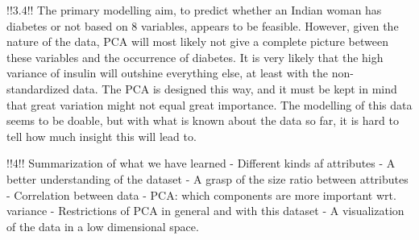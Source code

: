 !!3.4!!
The primary modelling aim, to predict whether an Indian woman has diabetes or not
based on 8 variables, appears to be feasible. However, given the nature of the
data, PCA will most likely not give a complete picture between these variables
and the occurrence of diabetes. It is very likely that the high variance of
insulin will outshine everything else, at least with the non-standardized
data. The PCA is designed this way, and it must be kept in mind that great
variation might not equal great importance.
The modelling of this data seems to be doable, but with what is known about the data
so far, it is hard to tell how much insight this will lead to.

!!4!!
Summarization of what we have learned
- Different kinds af attributes
- A better understanding of the dataset
- A grasp of the size ratio between attributes
- Correlation between data
- PCA: which components are more important wrt. variance
- Restrictions of PCA in general and with this dataset
- A visualization of the data in a low dimensional space.
